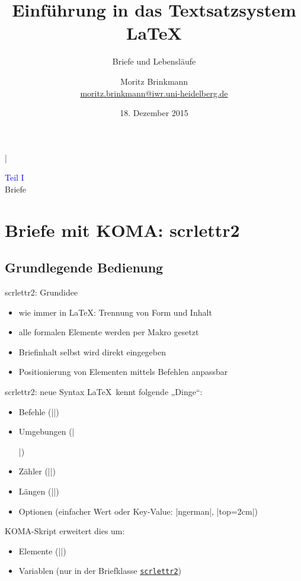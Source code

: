 \documentclass{beamer}
\newcommand{\pkg}[1]{\href{http://ctan.org/pkg/#1}{\alert{\texttt{#1}}}}
\begin{document}
\MakeShortVerb|

\title{Einführung in das Textsatzsystem \LaTeX{}}
\subtitle{Briefe und Lebensläufe}
\author[Mo]{Moritz Brinkmann\\\url{moritz.brinkmann@iwr.uni-heidelberg.de}}
\date{18. Dezember 2015}

\frame{\titlepage}

\begin{frame}[c]
\centering
\huge\textcolor{blue}{Teil I}\\\LARGE Briefe
\end{frame}

\section{Briefe mit KOMA: scrlettr2}
\subsection{Grundlegende Bedienung}

\begin{frame}{scrlettr2: Grundidee}
    \begin{itemize}
		\item wie immer in \LaTeX: Trennung von Form und Inhalt
		\item alle formalen Elemente werden per Makro gesetzt
		\item Briefinhalt selbst wird direkt eingegeben
		\item Positionierung von Elementen mittels Befehlen anpassbar
	\end{itemize}
\end{frame}

\begin{frame}[fragile]{scrlettr2: neue Syntax}
\LaTeX\ kennt folgende „Dinge“:
    \begin{itemize}
		\item Befehle (|\texttt{}|)
		\item Umgebungen (|\begin{abstract} \end{abstract}|)
		\item Zähler (|\thepage|)
		\item Längen (|\pageheight=3cm|)
		\item Optionen (einfacher Wert oder Key-Value: |ngerman|, |top=2cm|)
	\end{itemize}
KOMA-Skript erweitert dies um:
    \begin{itemize}
		\item Elemente (||) \pause
		\item \alert{Variablen} (nur in der Briefklasse \pkg{scrlettr2})
	\end{itemize}
\end{frame}
\end{document}
